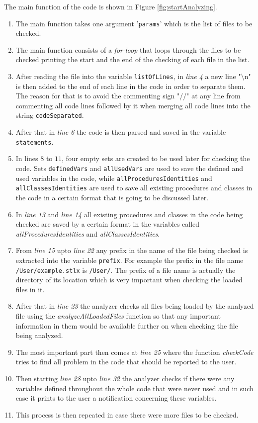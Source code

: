 \documentclass[11pt]{report}
\begin{document}
The main function of the code is shown in Figure \ref{fig:startAnalyzing}.
\begin{enumerate}
\item The main function takes one argument '\texttt{params}' which is the list of files to be checked.
\item The main function consists of a \textsl{for-loop} that loops through the files to be checked printing the start and the end of the checking of each file in the list.
\item After reading the file into the variable \texttt{listOfLines}, in \textsl{line 4} a new line "$\setminus$n" is then added to the end of each line in the code in order to separate them. The reason for that is to avoid the commenting sign "//" at any line from commenting all code lines followed by it when merging all code lines into the string \texttt{codeSeparated}.
\item After that in \textsl{line 6} the code is then parsed and saved in the variable \texttt{statements}.
\item In lines $8$ to $11$, four empty sets are created to be used later for checking the code. Sets \texttt{definedVars} and \texttt{allUsedVars} are used to save the defined and used variables in the code, while \texttt{allProceduresIdentities} and \texttt{allClassesIdentities} are used to save all existing procedures and classes in the code in a certain format that is going to be discussed later.
\item In \textsl{line 13} and \textsl{line 14} all existing procedures and classes in the code being checked are saved by a certain format in the variables called \textsl{allProceduresIdentities} and \textsl{allClassesIdentities}.
\item From \textsl{line 15} upto \textsl{line 22} any prefix in the name of the file being checked is extracted into the variable \texttt{prefix}. For example the prefix in the file name \texttt{/User/example.stlx} is \texttt{/User/}. The prefix of a file name is actually the directory of its location which is very important when checking the loaded files in it.
\item After that in \textsl{line 23} the analyzer checks all files being loaded by the analyzed file using the \textsl{analyzeAllLoadedFiles} function so that any important information in them would be available further on when checking the file being analyzed.
\item The most important part then comes at \textsl{line 25} where the function \textsl{checkCode} tries to find all problem in the code that should be reported to the user.
\item Then starting \textsl{line 28} upto \textsl{line 32} the analyzer checks if there were any variables defined throughout the whole code that were never used and in such case it prints to the user a notification concerning these variables.
\item This process is then repeated in case there were more files to be checked.
\end{enumerate}
\end{document}

